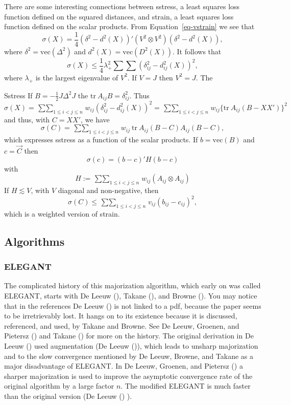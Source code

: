 \documentclass[
  12pt,
  letterpaper,
  DIV=11,
  numbers=noendperiod]{scrartcl}
\begin{document}
There are some interesting connections between sstress, a least squares
loss function defined on the squared distances, and strain, a least
squares loss function defined on the scalar products. From
Equation~\ref{eq-vstrain} we see that \[
\sigma(X)=\frac14(\delta^2-d^2(X))'(V^2\otimes V^2)(\delta^2-d^2(X)),
\] where \(\delta^2=\text{vec}(\Delta^2)\) and
\(d^2(X)=\text{vec}(D^2(X))\). It follows that \[
\sigma(X)\leq\frac14\lambda_+^2\sum\sum (\delta_{ij}^2-d_{ij}^2(X))^2,
\] where \(\lambda_+\) is the largest eigenvalue of \(V^2\). If \(V=J\)
then \(V^2=J\). The

Sstress If \(B=-\frac12J\Delta^2J\) the
\(\text{tr}\ A_{ij}B=\delta_{ij}^2\). Thus \[
\sigma(X)=\mathop{\sum\sum}_{1\leq i<j\leq n}w_{ij}(\delta_{ij}^2-d_{ij}^2(X))^2=
\mathop{\sum\sum}_{1\leq i<j\leq n}w_{ij}\{\text{tr}\ A_{ij}(B-XX')\}^2
\] and thus, with \(C=XX'\), we have \[
\sigma(C)=\mathop{\sum\sum}_{1\leq i<j\leq n}w_{ij}\ \text{tr}\ A_{ij}(B-C)A_{ij}(B-C),
\] which expresses sstress as a function of the scalar products. If
\(b=\text{vec}(B)\) and \(c=\vec{C}\) then \[
\sigma(c)=(b-c)'H(b-c)
\] with \[
H:=\mathop{\sum\sum}_{1\leq i<j\leq n}w_{ij}(A_{ij}\otimes A_{ij})
\] If \(H\lesssim V\), with \(V\) diagonal and non-negative, then \[
\sigma(C)\leq\mathop{\sum\sum}_{1\leq i<j\leq n}v_{ij}(b_{ij}-c_{ij})^2,
\] which is a weighted version of strain.

\subsection{Algorithms}\label{algorithms}

\subsubsection{ELEGANT}\label{elegant}

The complicated history of this majorization algorithm, which early on
was called ELEGANT, starts with De Leeuw
(), Takane
(), and Browne
(). You may notice that in the references
De Leeuw () is not linked to a pdf,
because the paper seems to be irretrievably lost. It hangs on to its
existence because it is discussed, referenced, and used, by Takane and
Browne. See De Leeuw, Groenen, and Pietersz
() and Takane
() for more on the history. The original
derivation in De Leeuw () used
augmentation (De Leeuw ()), which
leads to unsharp majorization and to the slow convergence mentioned by
De Leeuw, Browne, and Takane as a major disadvantage of ELEGANT. In De
Leeuw, Groenen, and Pietersz
() a sharper
majorization is used to improve the asymptotic convergence rate of the
original algorithm by a large factor \(n\). The modified ELEGANT is much
faster than the original version (De Leeuw
() ).
\end{document}
